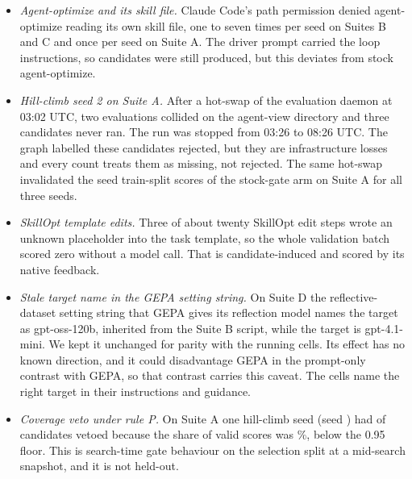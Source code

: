 \begin{itemize}[leftmargin=*,nosep]
\item \emph{Agent-optimize and its skill file.} Claude Code's path permission denied agent-optimize reading its own skill file, one to seven times per seed on Suites B and C and once per seed on Suite A. The driver prompt carried the loop instructions, so candidates were still produced, but this deviates from stock agent-optimize.
\item \emph{Hill-climb seed 2 on Suite A.} After a hot-swap of the evaluation daemon at 03:02 UTC, two evaluations collided on the agent-view directory and three candidates never ran. The run was stopped from 03:26 to 08:26 UTC. The graph labelled these candidates rejected, but they are infrastructure losses and every count treats them as missing, not rejected. The same hot-swap invalidated the seed train-split scores of the stock-gate arm on Suite A for all three seeds.
\item \emph{SkillOpt template edits.} Three of about twenty SkillOpt edit steps wrote an unknown placeholder into the task template, so the whole validation batch scored zero without a model call. That is candidate-induced and scored by its native feedback.
\item \emph{Stale target name in the GEPA setting string.} On Suite D the reflective-dataset setting string that GEPA gives its reflection model names the target as gpt-oss-120b, inherited from the Suite B script, while the target is gpt-4.1-mini. We kept it unchanged for parity with the running cells. Its effect has no known direction, and it could disadvantage GEPA in the prompt-only contrast with GEPA, so that contrast carries this caveat. The \capevolve{} cells name the right target in their instructions and guidance.
\item \emph{Coverage veto under rule P.} On Suite A one hill-climb seed (seed \stVetoHcASeed{}) had \stVetoHcAIndecisive{} of \stVetoHcACands{} candidates vetoed because the share of valid scores was \stVetoHcACoverage{}\%, below the 0.95 floor. This is search-time gate behaviour on the selection split at a mid-search snapshot, and it is not held-out.

\end{itemize}
